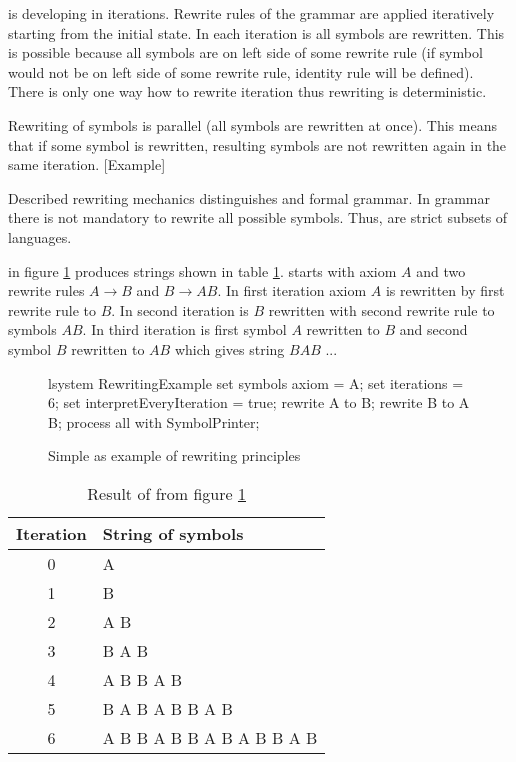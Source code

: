 \lsystem is developing in iterations.
Rewrite rules of the \lsystem grammar are applied iteratively starting from the initial state.
In each iteration is all symbols are rewritten.
This is possible because all symbols are on left side of some rewrite rule (if symbol would not be on left side of some rewrite rule, identity rule will be defined).
There is only one way how to rewrite iteration thus rewriting is deterministic.


Rewriting of symbols is parallel (all symbols are rewritten at once).
This means that if some symbol is rewritten, resulting symbols are not rewritten again in the same iteration.
[Example]

Described rewriting mechanics distinguishes \lsystem and formal grammar.
In grammar there is not mandatory to rewrite all possible symbols.
Thus, \lsystems are strict subsets of languages.

\lsystem in figure \ref{fig:rrExample} produces strings shown in table \ref{fig:rrExampleResult}.
\lsystem starts with axiom $A$ and two rewrite rules $A \rightarrow B$ and $B \rightarrow A B$.
In first iteration axiom $A$ is rewritten by first rewrite rule to $B$.
In second iteration is $B$ rewritten with second rewrite rule to symbols $A B$.
In third iteration is first symbol $A$ rewritten to $B$ and second symbol $B$ rewritten to $A B$ which gives string $B A B$ ...

\begin{figure}[ht]
	\begin{Lsystem}
lsystem RewritingExample {
	set symbols axiom = A;
	set iterations = 6;
	set interpretEveryIteration = true;
	rewrite A to B;
	rewrite B to A B;
}
process all with SymbolPrinter;
	\end{Lsystem}
	\caption{Simple \lsystem as example of rewriting principles}
	\label{fig:rrExample}
\end{figure}

\begin{table}[ht]
	\centering
	\begin{tabular}{c l}
   		\toprule
   		Iteration & String of symbols \\
   		\midrule
		0 & A \\
		1 & B \\
		2 & A B \\
		3 & B A B \\
		4 & A B B A B \\
		5 & B A B A B B A B \\
		6 & A B B A B B A B A B B A B \\
		\bottomrule
	\end{tabular}
	\caption{Result of \lsystem from figure \ref{fig:rrExample}}
	\label{fig:rrExampleResult}
\end{table}

